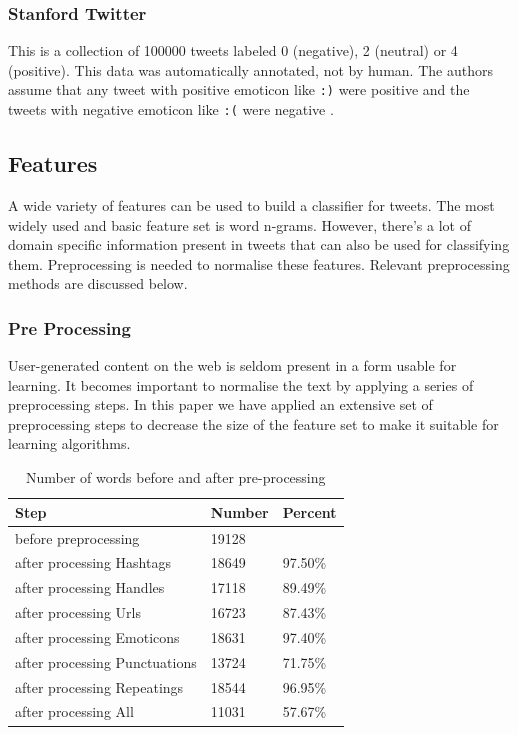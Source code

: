 \subsubsection{Stanford Twitter}
This is a collection of 100000 tweets labeled 0 (negative), 2 (neutral) or 4 (positive).
This data was automatically annotated, not by human.
The authors assume that any tweet with positive emoticon like \verb':)' were positive
	and the tweets with negative emoticon like \verb':(' were negative \cite{S140}.

\subsection{Features}
A wide variety of features can be used to build a classifier for tweets.
The most widely used and basic feature set is word n-grams.
However, there's a lot of domain specific information present in tweets that can also be used for classifying them.
Preprocessing is needed to normalise these features. Relevant preprocessing methods are discussed below.

\subsubsection{Pre Processing}

User-generated content on the web is seldom present in a form usable for learning.
It becomes important to normalise the text by applying a series of preprocessing steps.
In this paper we have applied an extensive set of preprocessing steps to
	decrease the size of the feature set to make it suitable for learning algorithms.

\begin{table}[h]
\centering
	\begin{tabular}{|l|l|l|}
	\hline
	Step & Number & Percent	\\
	\hline
	before preprocessing & 19128 & \\
	\hline
	after processing Hashtags & 18649 & 97.50\% \\
	after processing Handles & 17118 & 89.49\% \\
	after processing Urls & 16723 & 87.43\% \\
	after processing Emoticons & 18631 & 97.40\% \\
	after processing Punctuations & 13724 & 71.75\% \\
	after processing Repeatings & 18544 & 96.95\% \\
	\hline
	after processing All & 11031 & 57.67\% \\
	\hline
	\end{tabular}
\caption{Number of words before and after pre-processing}
\label{table:preproc_numwords}
\end{table}

